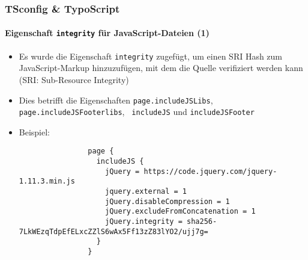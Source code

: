 
\begin{frame}[fragile]
	\frametitle{TSconfig \& TypoScript}
	\framesubtitle{Eigenschaft \texttt{integrity} für JavaScript-Dateien (1)}

	\lstset{basicstyle=\tiny\ttfamily}

	\begin{itemize}

		\item Es wurde die Eigenschaft \texttt{integrity} zugefügt, um einen
			SRI Hash zum JavaScript-Markup hinzuzufügen, mit dem die Quelle
			verifiziert werden kann (SRI: Sub-Resource Integrity)

		\item Dies betrifft die Eigenschaften \texttt{page.includeJSLibs},
			\texttt{page.includeJSFooterlibs}, \texttt{ includeJS} und
			\texttt{includeJSFooter}

		\item Beispiel:

			\begin{lstlisting}
				page {
				  includeJS {
				    jQuery = https://code.jquery.com/jquery-1.11.3.min.js
				    jquery.external = 1
				    jQuery.disableCompression = 1
				    jQuery.excludeFromConcatenation = 1
				    jQuery.integrity = sha256-7LkWEzqTdpEfELxcZZlS6wAx5Ff13zZ83lYO2/ujj7g=
				  }
				}
			\end{lstlisting}

	\end{itemize}

\end{frame}


